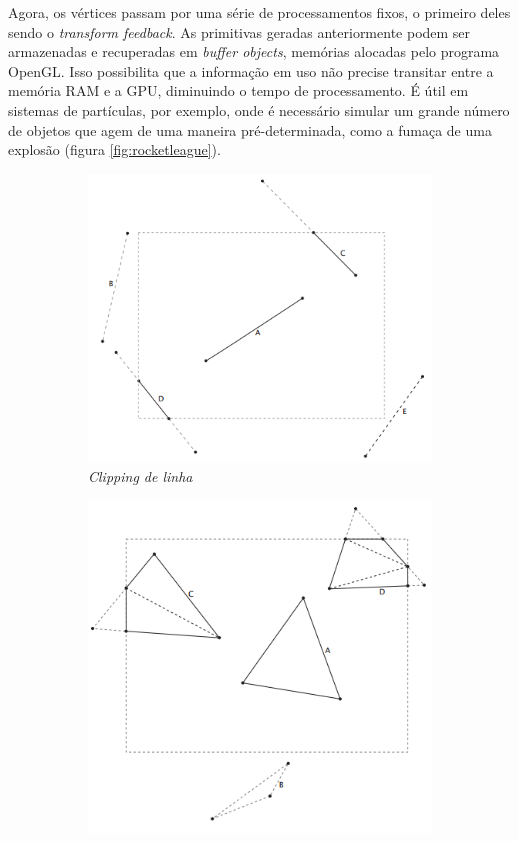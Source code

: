 Agora, os vértices passam por uma série de processamentos fixos, o primeiro deles sendo o \textit{transform feedback}. As primitivas geradas anteriormente podem ser armazenadas e recuperadas em \textit{buffer objects}, memórias alocadas pelo programa OpenGL. Isso possibilita que a informação em uso não precise transitar entre a memória RAM e a GPU, diminuindo o tempo de processamento. É útil em sistemas de partículas, por exemplo, onde é necessário simular um grande número de objetos que agem de uma maneira pré-determinada, como a fumaça de uma explosão (figura \ref{fig:rocketleague}).

\begin{figure}[H]
	\begin{subfigure}[b]{0.4\textwidth}
		\includegraphics[width=\textwidth]{imagens/line-clipping.png}
		\caption{\textit{Clipping de linha}}
		\label{fig:lineclipping}
	\end{subfigure}
	\hfill
	\begin{subfigure}[b]{0.4\textwidth}
		\includegraphics[width=\textwidth]{imagens/triangle-clipping.png}

\end{subfigure}
\end{figure}
